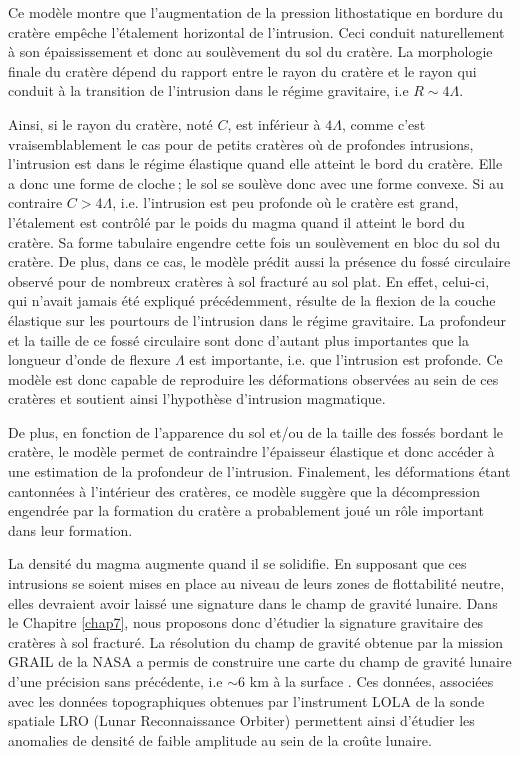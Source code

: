 Ce modèle montre que l’augmentation de la pression lithostatique en
bordure du cratère empêche l’étalement horizontal de l’intrusion. Ceci
conduit naturellement à son épaississement et donc au soulèvement du
sol du cratère. La morphologie finale du cratère dépend du rapport
entre le rayon du cratère et le rayon qui conduit à la transition de
l’intrusion dans le régime gravitaire, i.e $R\sim 4\Lambda$.

Ainsi, si le  rayon du cratère, noté $C$, est  inférieur à $4\Lambda$,
comme c’est  vraisemblablement le  cas pour de  petits cratères  où de
profondes intrusions,  l’intrusion est dans le  régime élastique quand
elle atteint le bord du cratère. Elle  a donc une forme de cloche ; le
sol  se  soulève  donc  avec  une  forme  convexe.   Si  au  contraire
$C>4\Lambda$,  i.e. l’intrusion  est peu  profonde où  le cratère  est
grand, l’étalement est contrôlé par le poids du magma quand il atteint
le  bord  du cratère.   Sa  forme  tabulaire  engendre cette  fois  un
soulèvement en bloc du sol du cratère. De plus, dans ce cas, le modèle
prédit aussi la présence du  fossé circulaire observé pour de nombreux
cratères à sol  fracturé au sol plat. En effet,  celui-ci, qui n’avait
jamais été expliqué  précédemment, résulte de la flexion  de la couche
élastique sur les pourtours de  l’intrusion dans le régime gravitaire.
La profondeur et  la taille de ce fossé circulaire  sont donc d’autant
plus  importantes que  la  longueur d’onde  de  flexure $\Lambda$  est
importante,  i.e. que  l’intrusion est  profonde. Ce  modèle est  donc
capable  de  reproduire les  déformations  observées  au sein  de  ces
cratères et soutient ainsi l’hypothèse d’intrusion magmatique.

De plus, en fonction de l’apparence du sol et/ou de la taille des
fossés bordant le cratère, le modèle permet de contraindre l’épaisseur
élastique et donc accéder à une estimation de la profondeur de
l’intrusion. Finalement, les déformations étant cantonnées à
l’intérieur des cratères, ce modèle suggère que la décompression
engendrée par la formation du cratère a probablement joué un rôle
important dans leur formation.

La densité du magma augmente quand il se solidifie. En supposant que
ces intrusions se soient mises en place au niveau de leurs zones de
flottabilité neutre, elles devraient avoir laissé une signature dans
le champ de gravité lunaire. Dans le Chapitre \ref{chap7}, nous
proposons donc d’étudier la signature gravitaire des cratères à sol
fracturé. La résolution du champ de gravité obtenue par la mission
GRAIL de la NASA a permis de construire une carte du champ de gravité
lunaire d’une précision sans précédente, i.e $\sim 6$ km à la surface
\citep{Zuber:2013cp}. Ces données, associées avec les données
topographiques obtenues par l’instrument LOLA de la sonde spatiale LRO
(Lunar Reconnaissance Orbiter) permettent ainsi d’étudier les
anomalies de densité de faible amplitude au sein de la croûte lunaire.

